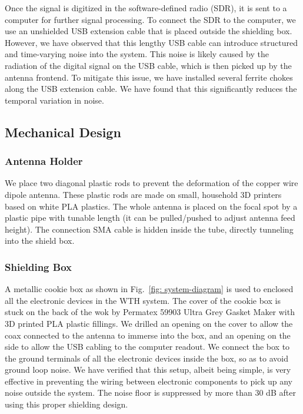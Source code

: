 \documentclass[12pt]{article}
\begin{document}
    Once the signal is digitized in the software-defined radio (SDR), it is sent to a computer for further signal processing. 
    To connect the SDR to the computer, we use an unshielded USB extension cable that is placed outside the shielding box. However, we have observed that this lengthy USB cable can introduce structured and time-varying noise into the system. 
    This noise is likely caused by the radiation of the digital signal on the USB cable, which is then picked up by the antenna frontend. 
    To mitigate this issue, we have installed several ferrite chokes along the USB extension cable. We have found that this significantly reduces the temporal variation in noise.
    
    \subsection{Mechanical Design}
    \subsubsection{Antenna Holder}
    We place two diagonal plastic rods to prevent the deformation of the copper wire dipole antenna. These plastic rods are made on small, household 3D printers based on white PLA plastics. The whole antenna is placed on the focal spot by a plastic pipe with tunable length (it can be pulled/pushed to adjust antenna feed height). The connection SMA cable is hidden inside the tube, directly tunneling into the shield box. 

    
    \subsubsection{Shielding Box} \label{sect: shielding}
    A metallic cookie box as shown in Fig.~\ref{fig: system-diagram} is used to enclosed all the electronic devices in the WTH system.
    The cover of the cookie box is stuck on the back of the wok by Permatex 59903 Ultra Grey Gasket Maker with 3D printed PLA plastic fillings.
    We drilled an opening on the cover to allow the coax connected to the antenna to immerse into the box, and an opening on the side to allow the USB cabling to the computer readout. 
    We connect the box to the ground terminals of all the electronic devices inside the box, so as to avoid ground loop noise.
    We have verified that this setup, albeit being simple, is very effective in preventing the wiring between electronic components to pick up any noise outside the system.
    The noise floor is suppressed by more than $30$ dB after using this proper shielding design.
    
\end{document}
